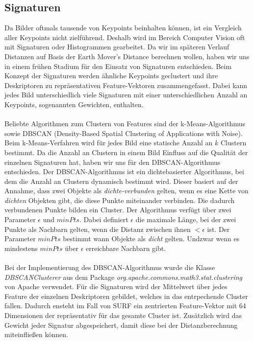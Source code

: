 \documentclass{scrartcl}
\begin{document}
\subsection{Signaturen}
Da Bilder oftmals tausende von Keypoints beinhalten können, ist ein Vergleich aller Keypoints nicht zielführend. Deshalb wird im Bereich Computer Vision oft mit Signaturen oder Histogrammen gearbeitet. Da wir im späteren Verlauf Distanzen auf Basis der Earth Mover's Distance berechnen wollen, haben wir uns in einem frühen Stadium für den Einsatz von Signaturen entschieden. Beim Konzept der Signaturen werden ähnliche Keypoints geclustert und ihre Deskriptoren zu repräsentativen Feature-Vektoren zusammengefasst. Dabei kann jedes Bild unterschiedlich viele Signaturen mit einer unterschiedlichen Anzahl an Keypoints, sogenannten Gewichten, enthalten.
\\
\\
Beliebte Algorithmen zum Clustern von Features sind der k-Means-Algorithmus sowie DBSCAN (Density-Based Spatial Clustering of Applications with Noise). Beim k-Means-Verfahren wird für jedes Bild eine statische Anzahl an $k$ Clustern bestimmt. Da die Anzahl an Clustern in einem Bild Einfluss auf die Qualität der einzelnen Signaturen hat, haben wir uns für den DBSCAN-Algorithmus entschieden. Der DBSCAN-Algorithmus ist ein dichtebasierter Algorithmus, bei dem die Anzahl an Clustern dynamisch bestimmt wird. Dieser basiert auf der Annahme, dass zwei Objekte als \textit{dichte-verbunden} gelten, wenn es eine Kette von \textit{dichten} Objekten gibt, die diese Punkte miteinander verbinden. Die dadurch verbundenen Punkte bilden ein Cluster. Der Algorithmus verfügt über zwei Parameter $\epsilon$ und $minPts$. Dabei definiert $\epsilon$ die maximale Länge, bei der zwei Punkte als Nachbarn gelten, wenn die Distanz zwischen ihnen  $< \epsilon$ ist. Der Parameter $minPts$  bestimmt wann Objekte als \textit{dicht} gelten. Undzwar wenn es mindestens $minPts$ über $\epsilon$ erreichbare Nachbarn gibt.
\\
\\
Bei der Implementierung des DBSCAN-Algorithmus wurde die Klasse \textit{DBSCANClusterer} aus dem Package \textit{org.apache.commons.math3.stat.clustering} von Apache verwendet. Für die Signaturen wird der Mittelwert über jedes Feature der einzelnen Deskriptoren gebildet, welches in das entrpechende Cluster fallen. Dadurch ensteht im Fall von SURF ein zentrierten Feature-Vektor mit 64 Dimensionen der repräsentativ für das gesamte Cluster ist. Zusätzlich wird das Gewicht jeder Signatur abgespeichert, damit diese bei der Distanzberechnung miteinfließen können.
\end{document}
